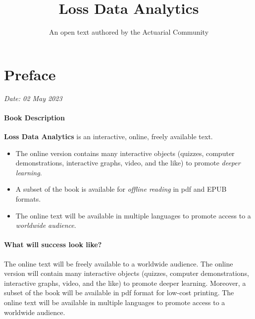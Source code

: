 \documentclass[
]{book}
\title{Loss Data Analytics}
\author{An open text authored by the Actuarial Community}
\date{}
\providecommand{\tightlist}{%
  \setlength{\itemsep}{0pt}\setlength{\parskip}{0pt}}
\begin{document}
\maketitle

{
\setcounter{tocdepth}{2}
\tableofcontents
}
\hypertarget{preface}{%
\chapter*{Preface}\label{preface}}

\emph{Date: 02 May 2023}

\hypertarget{book-description}{%
\subsubsection*{Book Description}\label{book-description}}

\textbf{Loss Data Analytics} is an interactive, online, freely available text.

\begin{itemize}
\tightlist
\item
  The online version contains many interactive objects (quizzes, computer demonstrations, interactive graphs, video, and the like) to promote \emph{deeper learning}.
\item
  A subset of the book is available for \emph{offline reading} in pdf and EPUB formats.
\item
  The online text will be available in multiple languages to promote access to a \emph{worldwide audience}.
\end{itemize}

\hypertarget{what-will-success-look-like}{%
\subsubsection*{What will success look like?}\label{what-will-success-look-like}}

The online text will be freely available to a worldwide audience. The online version will contain many interactive objects (quizzes, computer demonstrations, interactive graphs, video, and the like) to promote deeper learning. Moreover, a subset of the book will be available in pdf format for low-cost printing. The online text will be available in multiple languages to promote access to a worldwide audience.
\end{document}
